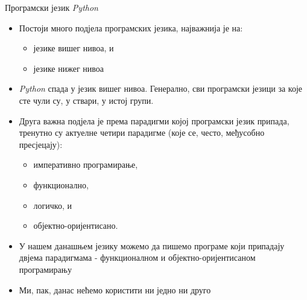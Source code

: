 \documentclass{beamer}
\begin{document}
\begin{frame}{Програмски језик \textit{Python}}
\begin{itemize}
    \item Постоји много подјела програмских језика, најважнија је на:
    \begin{itemize}
        \item језике вишег нивоа, и
        \item језике нижег нивоа
    \end{itemize}
    \item \textit{Python} спада у језик вишег нивоа. Генерално, сви програмски језици за које сте чули су, у ствари, у истој групи.
    \item Друга важна подјела је према парадигми којој програмски језик припада, тренутно су актуелне четири парадигме (које се, често, међусобно пресјецају):
    \begin{itemize}
        \item императивно програмирање,
        \item функционално,
        \item логичко, и
        \item објектно-оријентисано.
    \end{itemize}
    \item У нашем данашњем језику можемо да пишемо програме који припадају двјема парадигмама - функционалном и објектно-оријентисаном програмирању
    \item Ми, пак, данас нећемо користити ни једно ни друго
\end{itemize}
\end{frame}
\end{document}

